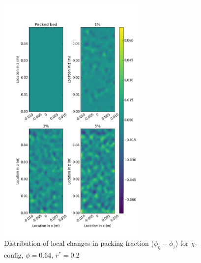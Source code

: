 \begin{figure}[!t]
    \centering
    \includegraphics[width = 0.65\textwidth]{figures/x-64-r125-1-deltas.png}
    \caption{Distribution of local changes in packing fraction ($\phi_{\eta} - \phi_i$) for $\chi$-config, $\phi = 0.64$, $r^* = 0.2$}\label{fig:x-64-r125-deltas}
\end{figure}






